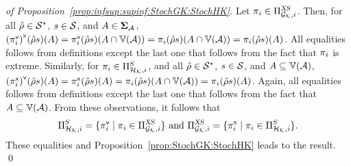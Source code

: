 \begin{proof}[of Proposition~\ref{prop:infsup:supinf:StochGK:StochHK}]
  Let $\pi_i\in\Pi_{{\mathcal{G}_{\mathcal{K}}},i}^{\textsl{X}\textsl{S}}$.  Then, for all
  $\hat{\rho}\in\mathcal{S}^*$, $s\in\mathcal{S}$, and
  $A\in\bm{\Sigma}_{\mathcal{A}}$,
  ${({\pi}^{\mathsf{v}}_i)}^{\mathsf{x}}(\hat{\rho}s)(A)={\pi}^{\mathsf{v}}_i(\hat{\rho}s)(A\cap\mathbb{V}(\mathcal{A}))=\pi_i(\hat{\rho}s)(A\cap\mathbb{V}(\mathcal{A}))=\pi_i(\hat{\rho}s)(A)$.
  All equalities follows from definitions except the last one that
  follows from the fact that $\pi_i$ is extreme.
  Similarly, for $\pi_i\in\Pi_{{\mathcal{H}_{\mathcal{K}}},i}^{\textsl{S}}$, and all
  $\hat{\rho}\in\mathcal{S}^*$, $s\in\mathcal{S}$, and
  $A\subseteq\mathbb{V}(\mathcal{A})$,
  ${({\pi}^{\mathsf{x}}_i)}^{\mathsf{v}}(\hat{\rho}s)(A)={\pi}^{\mathsf{x}}_i(\hat{\rho}s)(A)=\pi_i(\hat{\rho}s)(A\cap\mathbb{V}(\mathcal{A}))=\pi_i(\hat{\rho}s)(A)$.
  Again, all equalities follows from definitions except the last one
  that follows from the fact that $A\subseteq\mathbb{V}(\mathcal{A})$.
  From these observations, it follows that
  \begin{equation}\label{eq:observation:semimarkov:xsemimarkov}
    \Pi_{{\mathcal{H}_{\mathcal{K}}},i}^{\textsl{S}}=\{{\pi}^{\mathsf{v}}_i\mid\pi_i\in\Pi_{{\mathcal{G}_{\mathcal{K}}},i}^{\textsl{X}\textsl{S}}\}
    \text{ and }
    \Pi_{{\mathcal{G}_{\mathcal{K}}},i}^{\textsl{X}\textsl{S}}=\{{\pi}^{\mathsf{x}}_i\mid\pi_i\in\Pi_{{\mathcal{H}_{\mathcal{K}}},i}^{\textsl{S}}\}.
  \end{equation}
  These equalities and Proposition~\ref{prop:StochGK:StochHK} leads to
  the result.
  \qed
\end{proof}



